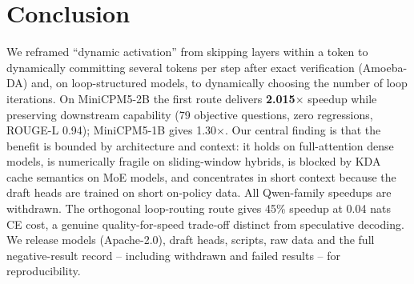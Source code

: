 \documentclass[11pt,a4paper]{article}
\begin{document}
\section{Conclusion}
We reframed ``dynamic activation'' from skipping layers within a token to dynamically
committing several tokens per step after exact verification (Amoeba-DA) and, on loop-structured
models, to dynamically choosing the number of loop iterations. On MiniCPM5-2B the first route
delivers \textbf{2.015$\times$} speedup while preserving downstream capability (79 objective
questions, zero regressions, ROUGE-L 0.94); MiniCPM5-1B gives 1.30$\times$. Our central finding
is that the benefit is bounded by architecture and context: it holds on full-attention dense
models, is numerically fragile on sliding-window hybrids, is blocked by KDA cache semantics on
MoE models, and concentrates in short context because the draft heads are trained on short
on-policy data. All Qwen-family speedups are withdrawn. The orthogonal loop-routing route gives
45\% speedup at 0.04 nats CE cost, a genuine quality-for-speed trade-off distinct from
speculative decoding. We release models (Apache-2.0), draft heads, scripts, raw data and the
full negative-result record -- including withdrawn and failed results -- for reproducibility.
\end{document}
